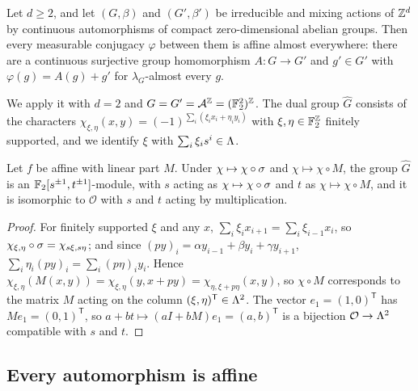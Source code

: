 \begin{theorem}\label{aff:thm:KS}
Let $d\ge2$, and let $(G,\beta)$ and $(G',\beta')$ be irreducible and mixing actions of $\mathbb{Z}^d$ by continuous automorphisms of compact zero-dimensional abelian groups. Then every measurable conjugacy $\varphi$ between them is affine almost everywhere: there are a continuous surjective group homomorphism $A\colon G\to G'$ and $g'\in G'$ with $\varphi(g)=A(g)+g'$ for $\lambda_G$-almost every $g$.
\end{theorem}

We apply it with $d=2$ and $G=G'=\mathcal{A}^{\mathbb{Z}}=(\mathbb{F}_2^2)^{\mathbb{Z}}$. The dual group $\widehat G$ consists of the characters $\chi_{\xi,\eta}(x,y)=(-1)^{\sum_i(\xi_ix_i+\eta_iy_i)}$ with $\xi,\eta\in\mathbb{F}_2^{\mathbb{Z}}$ finitely supported, and we identify $\xi$ with $\sum_i\xi_is^i\in\Lambda$.

\begin{lemma}\label{aff:lem:dual}
Let $f$ be affine with linear part $M$. Under $\chi\mapsto\chi\circ\sigma$ and $\chi\mapsto\chi\circ M$, the group $\widehat G$ is an $\mathbb{F}_2[s^{\pm1},t^{\pm1}]$-module, with $s$ acting as $\chi\mapsto\chi\circ\sigma$ and $t$ as $\chi\mapsto\chi\circ M$, and it is isomorphic to $\mathcal O$ with $s$ and $t$ acting by multiplication.
\end{lemma}

\begin{proof}
For finitely supported $\xi$ and any $x$, $\sum_i\xi_ix_{i+1}=\sum_i\xi_{i-1}x_i$, so $\chi_{\xi,\eta}\circ\sigma=\chi_{s\xi,s\eta}$; and since $(py)_i=\alpha y_{i-1}+\beta y_i+\gamma y_{i+1}$, $\sum_i\eta_i(py)_i=\sum_i(p\eta)_iy_i$. Hence $\chi_{\xi,\eta}(M(x,y))=\chi_{\xi,\eta}(y,x+py)=\chi_{\eta,\xi+p\eta}(x,y)$, so $\chi\circ M$ corresponds to the matrix $M$ acting on the column $(\xi,\eta)^{\mathsf T}\in\Lambda^2$. The vector $e_1=(1,0)^{\mathsf T}$ has $Me_1=(0,1)^{\mathsf T}$, so $a+bt\mapsto(aI+bM)e_1=(a,b)^{\mathsf T}$ is a bijection $\mathcal O\to\Lambda^2$ compatible with $s$ and $t$.
\end{proof}

\subsection{Every automorphism is affine}\label{aff:sec:R}

